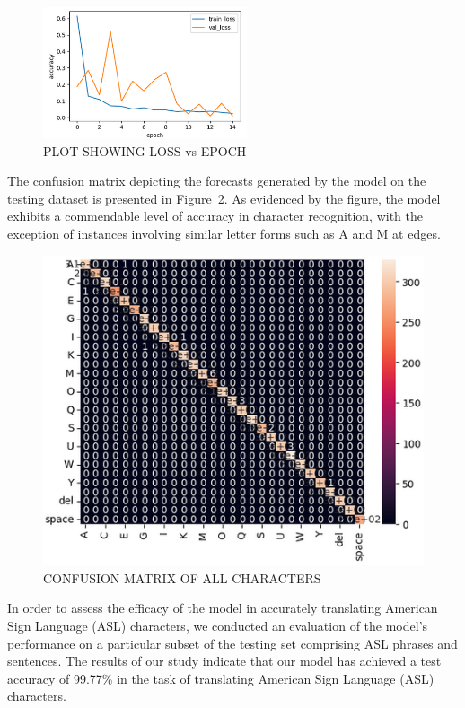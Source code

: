 \documentclass[conference]{IEEEtran}
\begin{document}
\begin{figure}[t!]
\centering
\includegraphics[width=6cm]{Images/loss_plot.png}
\caption{PLOT SHOWING LOSS vs EPOCH}
\label{Fig:Figure4}
\end{figure}

The confusion matrix depicting the forecasts generated by the model on the testing dataset is presented in Figure~\ref{Fig:Figure5}. As evidenced by the figure, the model exhibits a commendable level of accuracy in character recognition, with the exception of instances involving similar letter forms such as A and M at edges.

\begin{figure}[t!]
\centering
\includegraphics[width=14cm]{Images/confusion_matrix.png}
\caption{CONFUSION MATRIX OF ALL CHARACTERS}
\label{Fig:Figure5}
\end{figure}

In order to assess the efficacy of the model in accurately translating American Sign Language (ASL) characters, we conducted an evaluation of the model's performance on a particular subset of the testing set comprising ASL phrases and sentences. The results of our study indicate that our model has achieved a test accuracy of 99.77\% in the task of translating American Sign Language (ASL) characters.
\end{document}
